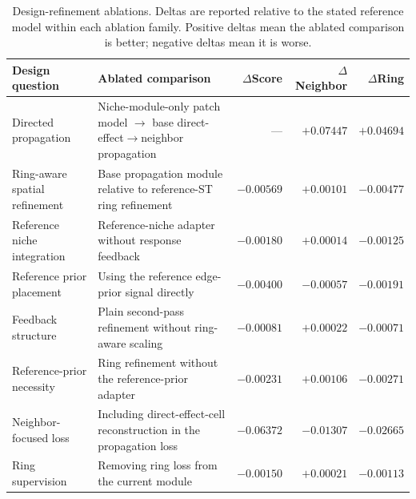 \documentclass[sigconf,anonymous,review]{acmart}
\begin{document}
\begin{table}[t]
\centering
\caption{Design-refinement ablations. Deltas are reported relative to the stated reference model within each ablation family. Positive deltas mean the ablated comparison is better; negative deltas mean it is worse.}
\label{tab:app_design_refinement_ablations}
\small
\setlength{\tabcolsep}{4pt}
\renewcommand{\arraystretch}{1.12}
\begin{tabularx}{\textwidth}{@{}>{\raggedright\arraybackslash}p{}
>{\raggedright\arraybackslash}X
rrr@{}}
\toprule
Design question & Ablated comparison & $\Delta$Score & $\Delta$Neighbor & $\Delta$Ring \\
\midrule

Directed propagation &
Niche-module-only patch model $\rightarrow$ base direct-effect$\rightarrow$neighbor propagation &
--- & $+0.07447$ & $+0.04694$ \\

Ring-aware spatial refinement &
Base propagation module relative to reference-ST ring refinement &
$-0.00569$ & $+0.00101$ & $-0.00477$ \\

Reference niche integration &
Reference-niche adapter without response feedback &
$-0.00180$ & $+0.00014$ & $-0.00125$ \\

Reference prior placement &
Using the reference edge-prior signal directly &
$-0.00400$ & $-0.00057$ & $-0.00191$ \\

Feedback structure &
Plain second-pass refinement without ring-aware scaling &
$-0.00081$ & $+0.00022$ & $-0.00071$ \\

Reference-prior necessity &
Ring refinement without the reference-prior adapter &
$-0.00231$ & $+0.00106$ & $-0.00271$ \\

Neighbor-focused loss &
Including direct-effect-cell reconstruction in the propagation loss &
$-0.06372$ & $-0.01307$ & $-0.02665$ \\

Ring supervision &
Removing ring loss from the current module &
$-0.00150$ & $+0.00021$ & $-0.00113$ \\

\bottomrule
\end{tabularx}
\end{table}
\end{document}
